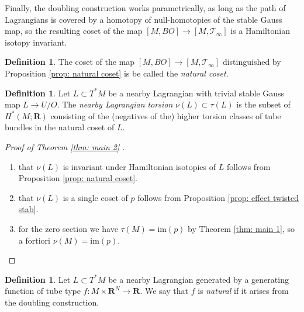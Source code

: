 \documentclass{amsart}
\newcommand\cT{\mathcal{T}}
\def\bR{\mathbf{R}}
\newtheorem{proposition}[theorem]{Proposition}
\theoremstyle{definition}
\newtheorem{definition}[theorem]{Definition}
\theoremstyle{remark}
\newtheorem{inductive lemma}[theorem]{Inductive Lemma}
\begin{document}
Finally, the doubling construction works parametrically, as long as the path of Lagrangians is covered by a homotopy of null-homotopies of the stable Gauss map, so the resulting coset of the map $[M,BO] \to [M, \cT_\infty] $ is a Hamiltonian isotopy invariant.

\begin{definition} The coset of the map $[M,BO] \to [M, \cT_\infty] $  distinguished by Proposition \ref{prop: natural coset} is be called the {\em natural coset}.\end{definition}




\begin{definition}
Let $L \subset T^*M$ be a nearby Lagrangian with trivial stable Gauss map $L \to U/O$. The {\em nearby Lagrangian torsion} $\nu(L) \subset \tau(L)$ is the subset of $H^*(M;\bR)$ consisting of the (negatives of the) higher torsion classes of tube bundles in the natural coset of $L$. 
\end{definition}


\begin{proof}[Proof of Theorem \ref{thm: main 2} ]$ \,$
  \begin{enumerate} 
   \item that $\nu(L)$ is invariant under Hamiltonian isotopies of $L$ follows from Proposition \ref{prop: natural coset}.
  \item that $\nu(L)$ is a single coset of $p$ follows from Proposition \ref{prop: effect twisted stab}.
   \item for the zero section we have $\tau(M)= \text{im}(p)$ by Theorem \ref{thm: main 1}, so a fortiori $\nu(M) = \text{im}(p)$.
  \end{enumerate}
\end{proof}

\begin{definition}
\label{def: natural}
Let $L \subset T^*M$ be a nearby Lagrangian generated by a generating function of tube type $f:M \times \bR^N \to \bR$. We say that $f$ is {\em{natural}} if it arises from the doubling construction.
\end{definition}
\end{document}
